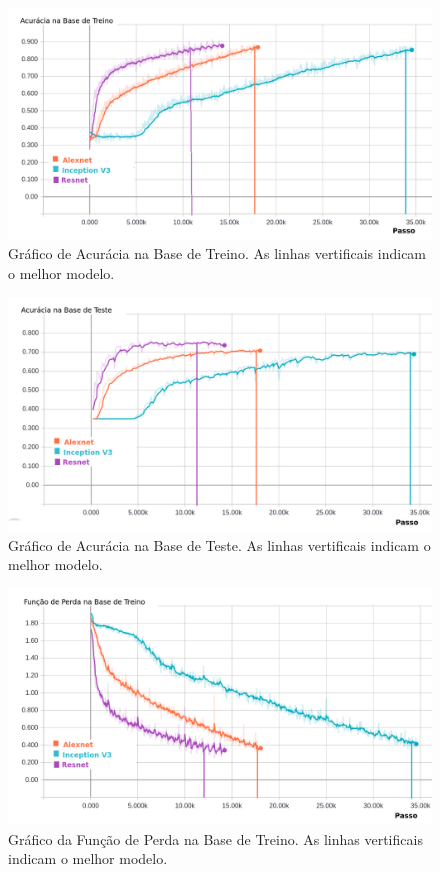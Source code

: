 \begin{figure}
\centering
\includegraphics[scale=0.5]{figuras/accuracy.png}
\caption{Gráfico de Acurácia na Base de Treino. As linhas vertificais indicam o melhor modelo. }
\label{fig:acc-train}
\end{figure}

\begin{figure}
\centering
\includegraphics[scale=0.5]{figuras/accuracy_val.png}
\caption{Gráfico de Acurácia na Base de Teste. As linhas vertificais indicam o melhor modelo.}
\label{fig:acc-val}
\end{figure}

\begin{figure}
\centering
\includegraphics[scale=0.5]{figuras/loss.png}
\caption{Gráfico da Função de Perda na Base de Treino. As linhas vertificais indicam o melhor modelo.}
\label{fig:loss-train}
\end{figure}


